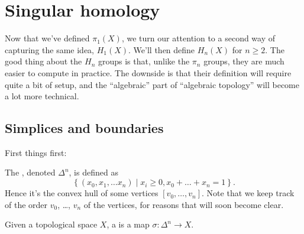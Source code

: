 \chapter{Singular homology}
\label{ch:singular_homology}
Now that we've defined $\pi_1(X)$,
we turn our attention to a second way of capturing the same idea, $H_1(X)$.
We'll then define $H_n(X)$ for $n \ge 2$.
The good thing about the $H_n$ groups is that, unlike the $\pi_n$ groups,
they are much easier to compute in practice.
The downside is that their definition will require quite a bit of setup,
and the ``algebraic'' part of ``algebraic topology'' will become a lot more technical.

\section{Simplices and boundaries}
First things first:
\begin{definition}
	The , denoted $\Delta^n$, is defined as
	\[ \left\{ (x_0 , x_1, \dots x_n) \mid x_i \ge 0, x_0+\dots+x_n=1 \right\}. \]
	Hence it's the convex hull of some vertices $[v_0, \dots, v_n]$.
	Note that we keep track of the order $v_0$, \dots, $v_n$ of the vertices,
	for reasons that will soon become clear.

	Given a topological space $X$, a  is a map $\sigma \colon \Delta^n \to X$.
\end{definition}
